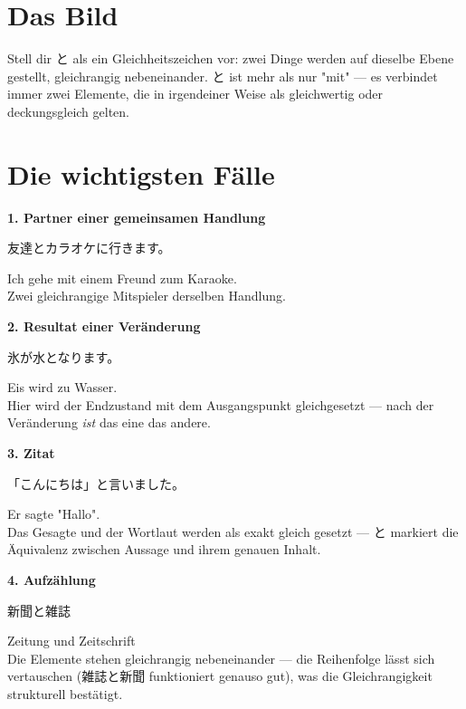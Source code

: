 \documentclass[12pt]{book}
\begin{document}
\section*{Das Bild}

Stell dir と als ein Gleichheitszeichen vor: zwei Dinge werden auf dieselbe Ebene gestellt, gleichrangig nebeneinander. と ist mehr als nur "mit" — es verbindet immer zwei Elemente, die in irgendeiner Weise als gleichwertig oder deckungsgleich gelten.

\section*{Die wichtigsten Fälle}

\textbf{1. Partner einer gemeinsamen Handlung}
\par\quad 友達とカラオケに行きます。\\
\par\quad Ich gehe mit einem Freund zum Karaoke.\\

Zwei gleichrangige Mitspieler derselben Handlung.

\textbf{2. Resultat einer Veränderung}
\par\quad 氷が水となります。\\
\par\quad Eis wird zu Wasser.\\

Hier wird der Endzustand mit dem Ausgangspunkt gleichgesetzt — nach der Veränderung \emph{ist} das eine das andere.

\textbf{3. Zitat}
\par\quad 「こんにちは」と言いました。\\
\par\quad Er sagte "Hallo".\\

Das Gesagte und der Wortlaut werden als exakt gleich gesetzt — と markiert die Äquivalenz zwischen Aussage und ihrem genauen Inhalt.

\textbf{4. Aufzählung}
\par\quad 新聞と雑誌\\
\par\quad Zeitung und Zeitschrift\\

Die Elemente stehen gleichrangig nebeneinander — die Reihenfolge lässt sich vertauschen (雑誌と新聞 funktioniert genauso gut), was die Gleichrangigkeit strukturell bestätigt.
\end{document}
